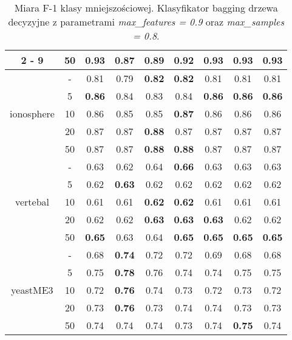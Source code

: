 \begin{table}[H]
\begin{center}
{\begin{tabular}{c|c|ccccccc}
				\cline{2%
					-%
					9}%
				&50&\textbf{0.93}&0.87&0.89&0.92&\textbf{0.93}&\textbf{0.93}&\textbf{0.93}\\%
				\hline%
				\multirow{5}{*}{ionosphere}&{-}&0.81&0.79&\textbf{0.82}&\textbf{0.82}&0.81&0.81&0.81\\%
				\cline{2%
					-%
					9}%
				&5&\textbf{0.86}&0.84&0.83&0.84&\textbf{0.86}&\textbf{0.86}&\textbf{0.86}\\%
				\cline{2%
					-%
					9}%
				&10&0.86&0.85&0.85&\textbf{0.87}&0.86&0.86&0.86\\%
				\cline{2%
					-%
					9}%
				&20&0.87&0.87&\textbf{0.88}&0.87&0.87&0.87&0.87\\%
				\cline{2%
					-%
					9}%
				&50&0.87&0.87&\textbf{0.88}&\textbf{0.88}&0.87&0.87&0.87\\%
				\hline%
				\multirow{5}{*}{vertebal}&{-}&0.63&0.62&0.64&\textbf{0.66}&0.63&0.63&0.63\\%
				\cline{2%
					-%
					9}%
				&5&0.62&\textbf{0.63}&0.62&0.62&0.62&0.62&0.62\\%
				\cline{2%
					-%
					9}%
				&10&0.61&0.61&\textbf{0.62}&\textbf{0.62}&0.61&0.61&0.61\\%
				\cline{2%
					-%
					9}%
				&20&0.62&0.62&\textbf{0.63}&\textbf{0.63}&\textbf{0.63}&0.62&0.62\\%
				\cline{2%
					-%
					9}%
				&50&\textbf{0.65}&0.63&0.64&\textbf{0.65}&\textbf{0.65}&\textbf{0.65}&\textbf{0.65}\\%
				\hline%
				\multirow{5}{*}{yeastME3}&{-}&0.68&\textbf{0.74}&0.72&0.72&0.69&0.68&0.68\\%
				\cline{2%
					-%
					9}%
				&5&0.75&\textbf{0.78}&0.76&0.74&0.74&0.75&0.75\\%
				\cline{2%
					-%
					9}%
				&10&0.72&\textbf{0.76}&0.74&0.73&0.72&0.73&0.72\\%
				\cline{2%
					-%
					9}%
				&20&0.73&\textbf{0.76}&0.73&0.74&0.74&0.73&0.73\\%
				\cline{2%
					-%
					9}%
				&50&0.74&0.74&0.74&0.73&0.74&\textbf{0.75}&0.74\\%
				\hline%
			\end{tabular}}
			\caption{Miara F-1 klasy mniejszościowej. Klasyfikator bagging drzewa decyzyjne z parametrami \textit{max\_features = 0.9} oraz \textit{max\_samples = 0.8}.}
			\label{baggingdrzewo2f1}
		\end{center}
	\end{table}
	
